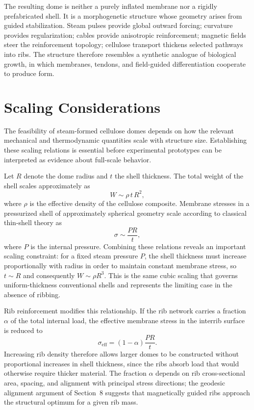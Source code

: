 \documentclass[12pt,a4paper]{article}
\begin{document}
The resulting dome is neither a purely inflated membrane nor a rigidly
prefabricated shell. It is a morphogenetic structure whose geometry
arises from guided stabilization. Steam pulses provide global outward
forcing; curvature provides regularization; cables provide anisotropic
reinforcement; magnetic fields steer the reinforcement topology;
cellulose transport thickens selected pathways into ribs. The structure
therefore resembles a synthetic analogue of biological growth, in which
membranes, tendons, and field-guided differentiation cooperate to
produce form.

\section{Scaling Considerations}

The feasibility of steam-formed cellulose domes depends on how the
relevant mechanical and thermodynamic quantities scale with structure
size. Establishing these scaling relations is essential before
experimental prototypes can be interpreted as evidence about full-scale
behavior.

Let $R$ denote the dome radius and $t$ the shell thickness. The total
weight of the shell scales approximately as
\begin{equation}
W \sim \rho\, t\, R^2,
\end{equation}
where $\rho$ is the effective density of the cellulose composite.
Membrane stresses in a pressurized shell of approximately spherical
geometry scale according to classical thin-shell theory as
\begin{equation}
\sigma \sim \frac{PR}{t},
\end{equation}
where $P$ is the internal pressure. Combining these relations reveals
an important scaling constraint: for a fixed steam pressure $P$, the
shell thickness must increase proportionally with radius in order to
maintain constant membrane stress, so $t \sim R$ and consequently
$W \sim \rho R^3$. This is the same cubic scaling that governs
uniform-thickness conventional shells and represents the limiting case
in the absence of ribbing.

Rib reinforcement modifies this relationship. If the rib network carries
a fraction $\alpha$ of the total internal load, the effective membrane
stress in the interrib surface is reduced to
\begin{equation}
\sigma_{\mathrm{eff}} = (1-\alpha)\frac{PR}{t}.
\end{equation}
Increasing rib density therefore allows larger domes to be constructed
without proportional increases in shell thickness, since the ribs
absorb load that would otherwise require thicker material. The fraction
$\alpha$ depends on rib cross-sectional area, spacing, and alignment
with principal stress directions; the geodesic alignment argument of
Section~8 suggests that magnetically guided ribs approach the
structural optimum for a given rib mass.
\end{document}
